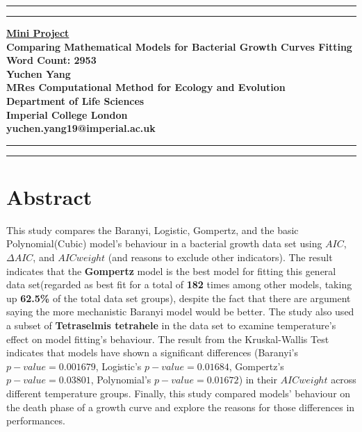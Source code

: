 \documentclass[11pt]{article}
\newcommand{\soptitle}{Comparing Mathematical Models for Bacterial Growth Curves Fitting}
\begin{document}
\begin{titlepage}
\begin{center}
\hrule
\vspace{2pt}
\hrule
\vspace{2cm}
\LARGE {\bf \underline{Mini Project}}\\
\vspace{2cm}
\huge{\bf \soptitle}\\
\large {\bf Word Count: 2953}\\
\vspace{8cm}
\LARGE {\bf Yuchen Yang}\\
\large {\bf MRes Computational Method for Ecology and Evolution}\\
\large {\bf Department of Life Sciences}\\
\large {\bf Imperial College London}\\
\large {\bf yuchen.yang19@imperial.ac.uk}
\vspace{2cm}
\end{center}
\hrule
\vspace{2pt}
\hrule
\end{titlepage}
\linenumbers
\section*{Abstract}
This study compares the Baranyi, Logistic, Gompertz, and the basic Polynomial(Cubic) model's behaviour in a bacterial growth data set using $AIC$, $\Delta AIC$, and $AIC weight$ (and reasons to exclude other indicators). The result indicates that the \textbf{Gompertz} model is the best model for fitting this general data set(regarded as best fit for a total of \textbf{182} times among other models, taking up \textbf{62.5\%} of the total data set groups), despite the fact that there are argument saying the more mechanistic Baranyi model would be better. The study also used a subset of \textbf{Tetraselmis tetrahele} in the data set to examine temperature's effect on model fitting's behaviour. The result from the Kruskal-Wallis Test indicates that models have shown a significant differences (Baranyi's $p-value = 0.001679$, Logistic's $p-value = 0.01684$, Gompertz's $p-value = 0.03801$, Polynomial's $p-value = 0.01672$) in their $AIC weight$ across different temperature groups. Finally, this study compared models' behaviour on the death phase of a growth curve and explore the reasons for those differences in performances.
\end{document}
